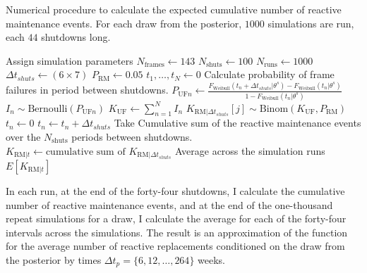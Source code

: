 \begin{algorithm}
	\caption{Numerical procedure to calculate the expected cumulative number of reactive maintenance events. For each draw from the posterior, $1000$ simulations are run, each $44$ shutdowns long.}
  \label{algo:K_RM}
	\begin{algorithmic}[1]
    \State Assign simulation parameters
    \State $N_{\text{frames}} \gets 143$         
    \State $N_{\text{shuts}} \gets 100$          
    \State $N_{\text{runs}} \gets 1000$          
    \State $\Delta t_{shuts} \gets (6 \times 7)$ 
    \State $P_{\text{RM}} \gets 0.05$            
    \State
        \State $t_1, \dots, t_N \gets 0$         
          \State Calculate probability of frame failures in period between shutdowns.
          \State $P_{\text{UF} n} \gets \frac{F_{\text{Weibull}}(t_n + \Delta t_{shuts} | \theta^s) - F_{\text{Weibull}}(t_n | \theta^s)}{1 - F_{\text{Weibull}}(t_n | \theta^s)}$
          \State $I_n \sim \mbox{Bernoulli}(P_{\text{UF} n})$   
          \State $K_{\text{UF}} \gets \sum^N_{n = 1} I_n$       
          \State $K_{\text{RM}|\Delta t_{shuts}}[j] \sim \mbox{Binom}(K_{\text{UF}}, P_{\text{RM}})$ 
              \State $t_n \gets 0$   
            \Else
              \State $t_n \gets t_n + \Delta t_{shuts}$   
            \EndIf
          \EndFor
        \EndFor
        \State Take Cumulative sum of the reactive maintenance events over the $N_{\text{shuts}}$ periods between shutdowns.
        \State $K_{\text{RM}|t} \gets \text{cumulative sum of } K_{\text{RM}|\Delta t_{shuts}}$
      \EndFor
    \State Average across the simulation runs
    \State $E[K_{\text{RM}|t}]$
    \EndFor
	\end{algorithmic} 
\end{algorithm} 

In each run, at the end of the forty-four shutdowns, I calculate the cumulative number of reactive maintenance events, and at the end of the one-thousand repeat simulations for a draw, I calculate the average for each of the forty-four intervals across the simulations. The result is an approximation of the function for the average number of reactive replacements conditioned on the draw from the posterior by times $\Delta t_p = \{6, 12, \dots, 264\}$ weeks.

